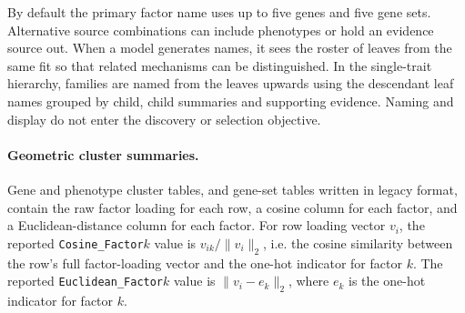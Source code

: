 \documentclass[11pt]{article}
\begin{document}
By default the primary factor name uses up to five genes and five gene sets. Alternative source combinations can include phenotypes or hold an evidence source out. When a model generates names, it sees the roster of leaves from the same fit so that related mechanisms can be distinguished. In the single-trait hierarchy, families are named from the leaves upwards using the descendant leaf names grouped by child, child summaries and supporting evidence. Naming and display do not enter the discovery or selection objective.

\paragraph{Geometric cluster summaries.}
Gene and phenotype cluster tables, and gene-set tables written in legacy format, contain the raw factor loading for each row, a cosine column for each factor, and a Euclidean-distance column for each factor. For row loading vector $v_i$, the reported \texttt{Cosine\_Factor}$k$ value is $v_{ik}/\|v_i\|_2$, i.e. the cosine similarity between the row's full factor-loading vector and the one-hot indicator for factor $k$. The reported \texttt{Euclidean\_Factor}$k$ value is $\|v_i-e_k\|_2$, where $e_k$ is the one-hot indicator for factor $k$.
\end{document}
